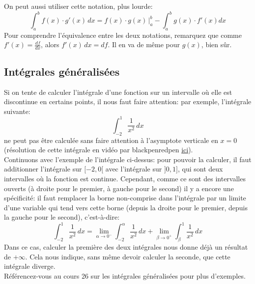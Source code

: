 \documentclass{article}
\begin{document}
On peut aussi utiliser cette notation, plus lourde:
\begin{equation*}
	\int_a^b f(x) \cdot g'(x) \, dx = f(x) \cdot g(x) \, \bigg|_a^b - \int_a^b g(x) \cdot f'(x) dx
\end{equation*}
Pour comprendre l'équivalence entre les deux notations, remarquez que comme \(f'(x) = \tfrac{df}{dx}\), alors \(f'(x) \, dx = df\). Il en va de même pour \(g(x)\), bien sûr.

\subsection{Intégrales généralisées}
Si on tente de calculer l'intégrale d'une fonction sur un intervalle où elle est discontinue en certains points, il nous faut faire attention: par exemple, l'intégrale suivante:
\begin{equation*}
	\int_{-2}^1 \dfrac{1}{x^2} \, dx
\end{equation*}
ne peut pas être calculée sans faire attention à l'asymptote verticale en \(x = 0\) (résolution de cette intégrale en vidéo par blackpenredpen \href{https://www.youtube.com/watch?v=bEWIdRu4ctM}{ici}). \\

Continuons avec l'exemple de l'intégrale ci-dessus: pour pouvoir la calculer, il faut additionner l'intégrale sur \([-2, 0[\) avec l'intégrale sur \(]0, 1]\), qui sont deux intervalles où la fonction est continue. Cependant, comme ce sont des intervalles ouverts (à droite pour le premier, à gauche pour le second) il y a encore une spécificité: il faut remplacer la borne non-comprise dans l'intégrale par un limite d'une variable qui tend vers cette borne (depuis la droite pour le premier, depuis la gauche pour le second), c'est-à-dire:
\begin{equation*}
	\int_{-2}^1 \dfrac{1}{x^2} \, dx = \lim_{\alpha \to 0^-} \int_{-2}^{\alpha} \dfrac{1}{x^2} \, dx + \lim_{\beta \to 0^+} \int_{\beta}^1 \dfrac{1}{x^2} \, dx
\end{equation*}
Dans ce cas, calculer la première des deux intégrales nous donne déjà un résultat de \(+\infty\). Cela nous indique, sans même devoir calculer la seconde, que cette intégrale diverge. \\

Référencez-vous au cours 26 sur les intégrales généralisées pour plus d'exemples.
\end{document}
